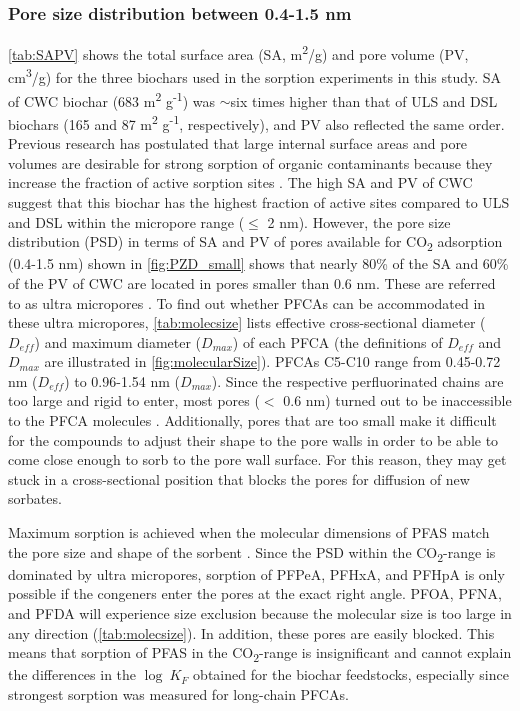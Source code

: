 \subsubsection{Pore size distribution between 0.4-1.5 nm}
\cref{tab:SAPV} shows the total surface area (SA, m\textsuperscript{2}/g) and pore volume (PV, cm\textsuperscript{3}/g) for the three biochars used in the sorption experiments in this study. SA of CWC biochar (683 m\textsuperscript{2} g\textsuperscript{-1}) was $\sim$six times higher than that of ULS and DSL biochars (165 and 87  m\textsuperscript{2} g\textsuperscript{-1}, respectively), and PV also reflected the same order. Previous research has postulated that large internal surface areas and pore volumes are desirable for strong sorption of organic contaminants because they increase the fraction of active sorption sites \citep{ahmed2020per,Hale2016}. The high SA and PV of CWC suggest that this biochar has the highest fraction of active sites compared to ULS and DSL within the micropore range ($\le$ 2 nm). However, the pore size distribution (PSD) in terms of SA and PV of pores available for CO\textsubscript{2} adsorption (0.4-1.5 nm) shown in \cref{fig:PZD_small} shows that nearly 80\% of the SA and 60\% of the PV of CWC are located in pores smaller than 0.6 nm. These are referred to as ultra micropores \citep{bardestani2019experimental}. To find out whether PFCAs can be accommodated in these ultra micropores, \cref{tab:molecsize} lists effective cross-sectional diameter ($D_{eff}$) and maximum diameter ($D_{max}$) of each PFCA (the definitions of $D_{eff}$ and $D_{max}$ are illustrated in \cref{fig:molecularSize}). PFCAs C5-C10 range from 0.45-0.72 nm ($D_{eff}$) to 0.96-1.54 nm ($D_{max}$). Since the respective perfluorinated chains are too large and rigid to enter, most pores ($<$ 0.6 nm) turned out to be inaccessible to the PFCA molecules \citep{yu2009sorption}. Additionally, pores that are too small make it difficult for the compounds to adjust their shape to the pore walls in order to be able to come close enough to sorb to the pore wall surface. For this reason, they may get stuck in a cross-sectional position that blocks the pores for diffusion of new sorbates. 

Maximum sorption is achieved when the molecular dimensions of PFAS match the pore size and shape of the sorbent \citep{Hale2016}. Since the \acrshort{PSD} within the CO\textsubscript{2}-range is dominated by ultra micropores, sorption of PFPeA, PFHxA, and PFHpA is only possible if the congeners enter the pores at the exact right angle. PFOA, PFNA, and PFDA will experience size exclusion because the molecular size is too large in any direction (\cref{tab:molecsize}). In addition, these pores are easily blocked. This means that sorption of PFAS in the CO\textsubscript{2}-range is insignificant and cannot explain the differences in the $\log~K_F$ obtained for the biochar feedstocks, especially since strongest sorption was measured for long-chain PFCAs.

